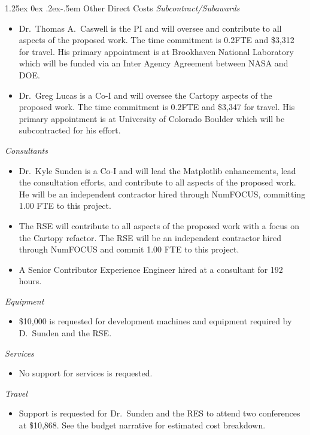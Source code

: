 \documentclass[12pt]{article}
\makeatletter
\numberwithin{page}{section}
\renewcommand{\paragraph}{%
  \@startsection{paragraph}{4}%
  {\z@}{1.25ex \@plus 0ex \@minus .2ex}{-.5em}%
  {\normalfont\normalsize\itshape\bfseries}%
}
\makeatother
\begin{document}
\paragraph{Other Direct Costs}
\textit{Subcontract/Subawards}
\begin{itemize}
  \item Dr.\ Thomas A.\ Caswell is the PI and will oversee and contribute to
    all aspects of the proposed work.  The time commitment is 0.2FTE and \$3,312
    for travel.  His primary appointment is at Brookhaven National Laboratory
    which will be funded via an Inter Agency Agreement between NASA and DOE.
\item Dr.\ Greg Lucas is a Co-I and will oversee the Cartopy aspects of
  the proposed work.  The time commitment is 0.2FTE and \$3,347 for travel.  His
  primary appointment is at University of Colorado Boulder which will be
  subcontracted for his effort.
\end{itemize}
\textit{Consultants}
\begin{itemize}
  \item Dr.\ Kyle Sunden is a Co-I and will lead the Matplotlib enhancements,
    lead the consultation efforts, and contribute to all aspects of the
    proposed work.  He will be an independent contractor hired through
    NumFOCUS, committing
    1.00 FTE to this project.
  \item The RSE will contribute to all aspects of the proposed work with a
    focus on the Cartopy refactor.  The RSE will be an independent contractor hired
    through NumFOCUS and commit 1.00 FTE to this project.
  \item A Senior Contributor Experience Engineer hired at a consultant for 192 hours.

\end{itemize}
\textit{Equipment}
\begin{itemize}
\item \$10,000 is requested for development machines and equipment required by D.\ Sunden and the RSE.
\end{itemize}
\textit{Services}
\begin{itemize}
\item No support for services is requested.
\end{itemize}
\textit{Travel}
\begin{itemize}
\item Support is requested for Dr.\ Sunden and the RES to attend two conferences at
  \$10,868.  See the budget narrative for estimated cost  breakdown.
\end{itemize}
\end{document}
